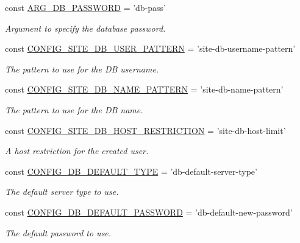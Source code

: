 \begin{DoxyCompactItemize}
const \hyperlink{group__args_ga3cb40cb5a16ad8799b2d00c1d799bac0}{A\-R\-G\-\_\-\-D\-B\-\_\-\-P\-A\-S\-S\-W\-O\-R\-D} = 'db-\/pass'
\begin{DoxyCompactList}\small\item\em Argument to specify the database password. \end{DoxyCompactList}\item 
const \hyperlink{group__config_ga8319751c1038f4e765582d9d917b84ac}{C\-O\-N\-F\-I\-G\-\_\-\-S\-I\-T\-E\-\_\-\-D\-B\-\_\-\-U\-S\-E\-R\-\_\-\-P\-A\-T\-T\-E\-R\-N} = 'site-\/db-\/username-\/pattern'
\begin{DoxyCompactList}\small\item\em The pattern to use for the D\-B username. \end{DoxyCompactList}\item 
const \hyperlink{group__config_ga956f5da5bf21d8a60c3cedecc94558cc}{C\-O\-N\-F\-I\-G\-\_\-\-S\-I\-T\-E\-\_\-\-D\-B\-\_\-\-N\-A\-M\-E\-\_\-\-P\-A\-T\-T\-E\-R\-N} = 'site-\/db-\/name-\/pattern'
\begin{DoxyCompactList}\small\item\em The pattern to use for the D\-B name. \end{DoxyCompactList}\item 
const \hyperlink{group__config_ga98433c135bef21924ba2ba4e4efc74e0}{C\-O\-N\-F\-I\-G\-\_\-\-S\-I\-T\-E\-\_\-\-D\-B\-\_\-\-H\-O\-S\-T\-\_\-\-R\-E\-S\-T\-R\-I\-C\-T\-I\-O\-N} = 'site-\/db-\/host-\/limit'
\begin{DoxyCompactList}\small\item\em A host restriction for the created user. \end{DoxyCompactList}\item 
const \hyperlink{group__config_ga070bb7c438b9a8de8aa4b6704f5f039d}{C\-O\-N\-F\-I\-G\-\_\-\-D\-B\-\_\-\-D\-E\-F\-A\-U\-L\-T\-\_\-\-T\-Y\-P\-E} = 'db-\/default-\/server-\/type'
\begin{DoxyCompactList}\small\item\em The default server type to use. \end{DoxyCompactList}\item 
const \hyperlink{group__config_ga7ff5e4ec0720dbe08189449eb5ac36b5}{C\-O\-N\-F\-I\-G\-\_\-\-D\-B\-\_\-\-D\-E\-F\-A\-U\-L\-T\-\_\-\-P\-A\-S\-S\-W\-O\-R\-D} = 'db-\/default-\/new-\/password'
\begin{DoxyCompactList}\small\item\em The default password to use. \end{DoxyCompactList}\item 

\end{DoxyCompactItemize}
